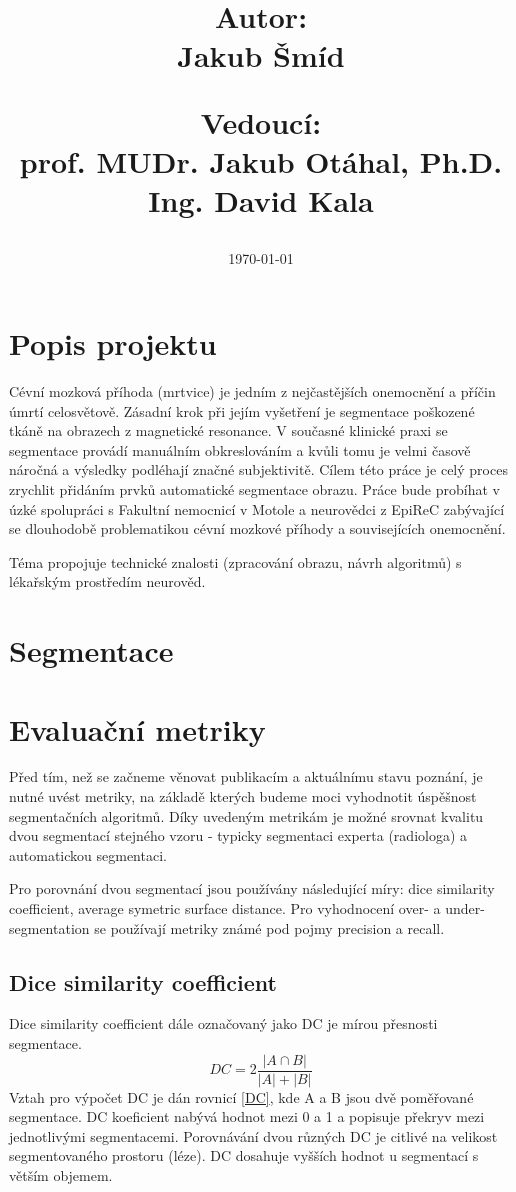 \documentclass[11pt]{article}
\date{\large \hfill \today}
\title{
	\ifdefined\Subtitle \large \Subtitle \\[1em] \fi
	\LARGE \textbf{\MainTitle} \\[2em]
	\begin{large}
	\begin{minipage}{3cm}
		\textbf{Autor:}\\
		Jakub Šmíd
	\end{minipage}
	\hfill
	\begin{minipage}{6cm}
		\textbf{Vedoucí:}\\
		prof. MUDr. Jakub Otáhal, Ph.D. \\
		Ing. David Kala
	\end{minipage}
	\end{large}
}
\begin{document}
\maketitle

\section{Popis projektu}
Cévní mozková příhoda (mrtvice) je jedním z nejčastějších onemocnění a příčin úmrtí celosvětově. Zásadní krok při jejím vyšetření je segmentace poškozené tkáně na obrazech z magnetické resonance. V současné klinické praxi se segmentace provádí manuálním obkreslováním a kvůli tomu je velmi časově náročná a výsledky podléhají značné subjektivitě. Cílem této práce je celý proces zrychlit přidáním prvků automatické segmentace obrazu.
Práce bude probíhat v úzké spolupráci s Fakultní nemocnicí v Motole a neurovědci z EpiReC zabývající se dlouhodobě problematikou cévní mozkové příhody a souvisejících onemocnění.

Téma propojuje technické znalosti (zpracování obrazu, návrh algoritmů) s lékařským prostředím neurověd.

\section{Segmentace}
\section{Evaluační metriky}
Před tím, než se začneme věnovat publikacím a aktuálnímu stavu poznání, je nutné uvést metriky, na základě kterých budeme moci vyhodnotit úspěšnost segmentačních algoritmů. Díky uvedeným metrikám je možné srovnat kvalitu dvou segmentací stejného vzoru - typicky segmentaci experta (radiologa) a automatickou segmentaci.

Pro porovnání dvou segmentací jsou používány následující míry: dice similarity coefficient, average symetric surface distance. Pro vyhodnocení \alert{over- a under-segmentation} se používají metriky známé pod pojmy precision a recall. \cite{Maier2016, Ito2018}
\subsection{Dice similarity coefficient}
Dice similarity coefficient dále označovaný jako DC je mírou přesnosti segmentace.
\begin{equation}
	\label{DC}
	DC = 2 \frac{|A \cap B|}{|A|+|B|}
\end{equation}
Vztah pro výpočet DC je dán rovnicí \ref{DC}, kde A a B jsou dvě poměřované segmentace. DC koeficient nabývá hodnot mezi 0 a 1 a popisuje překryv mezi jednotlivými segmentacemi. Porovnávání dvou různých DC je citlivé na velikost segmentovaného prostoru (léze). DC dosahuje vyšších hodnot u segmentací s větším objemem.
\end{document}
